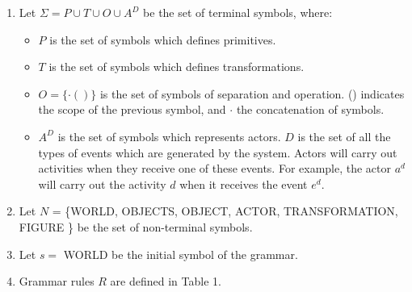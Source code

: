 \documentclass[10pt,journal,letterpaper,compsoc]{IEEEtran}
\begin{document}
\begin{enumerate}
    \item Let $\Sigma = P \cup T \cup O \cup A^D$ be the set of terminal symbols, where:

    \begin{itemize}
        \item $P$ is the set of symbols which defines primitives.

        \item $T$ is the set of symbols which defines transformations.

        \item $O = \{ \cdotp ( ) \}$ is the set of symbols of separation
and operation. () indicates the scope of the previous symbol, and $\cdotp$ the concatenation of
symbols.

        \item $A^D$ is the set of symbols which represents actors. $D$
is the set of all the types of events which are generated by the system. Actors
will carry out activities when they receive one of these events. For example,
the actor $a^d$ will carry out the activity $d$ when it
receives the event $e^d$.
    \end{itemize}



    \item Let $N$ = \{WORLD, OBJECTS, OBJECT, ACTOR, TRANSFORMATION,
FIGURE \} be the set of non-terminal symbols.

    \item Let $s =$ WORLD be the initial symbol of the grammar.

    \item Grammar rules $R$ are defined in Table 1.

\end{enumerate}
\end{document}
